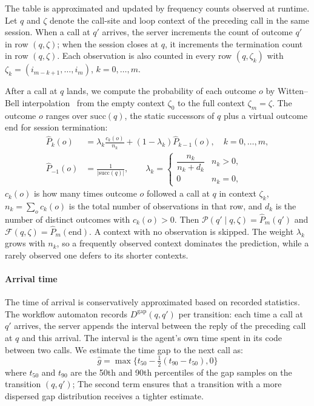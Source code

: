 The table is approximated and updated by frequency counts observed at runtime. Let $q$ and $\zeta$ denote the call-site and loop context of the preceding call in the same session. When a call at $q'$ arrives, the server increments the count of outcome $q'$ in row $(q,\zeta)$; when the session closes at $q$, it increments the termination count in row $(q,\zeta)$. Each observation is also counted in every row $(q,\zeta_k)$ with $\zeta_k=(i_{m-k+1},\dots,i_m)$, $k=0,\dots,m$.

After a call at $q$ lands, we compute the probability of each outcome $o$ by Witten--Bell interpolation~\cite{witten1991zero} from the empty context $\zeta_0$ to the full context $\zeta_m=\zeta$. The outcome $o$ ranges over $\mathrm{succ}(q)$, the static successors of $q$ plus a virtual outcome $\mathrm{end}$ for session termination:
\begin{align*}
\hat{P}_k(o) &= \lambda_k\frac{c_k(o)}{n_k}+(1-\lambda_k)\hat{P}_{k-1}(o),\quad k=0,\dots,m, \\
\hat{P}_{-1}(o) &= \frac{1}{|\mathrm{succ}(q)|},\qquad
\lambda_k=\begin{cases}\dfrac{n_k}{n_k+d_k} & n_k>0,\\[4pt] 0 & n_k=0,\end{cases}
\end{align*}
$c_k(o)$ is how many times outcome $o$ followed a call at $q$ in context $\zeta_k$, $n_k=\sum_o c_k(o)$ is the total number of observations in that row, and $d_k$ is the number of distinct outcomes with $c_k(o)>0$. Then $\mathcal{P}(q'\mid q,\zeta)=\hat{P}_m(q')$ and $\mathcal{F}(q,\zeta)=\hat{P}_m(\mathrm{end})$. A context with no observation is skipped. The weight $\lambda_k$ grows with $n_k$, so a frequently observed context dominates the prediction, while a rarely observed one defers to its shorter contexts.

\paragraph{Arrival time}
The time of arrival is conservatively approximated based on recorded statistics. The workflow automaton records $D^{\mathrm{gap}}(q,q')$ per transition: each time a call at $q'$ arrives, the server appends the interval between the reply of the preceding call at $q$ and this arrival. The interval is the agent's own time spent in its code between two calls. We estimate the time gap to the next call as:
\[
\hat{g}= \max \{t_{50}-\tfrac{1}{2}(t_{90}-t_{50}), 0 \}
\]
where $t_{50}$ and $t_{90}$ are the 50th and 90th percentiles of the gap samples on the transition $(q,q')$; The second term ensures that a transition with a more dispersed gap distribution receives a tighter estimate. 

